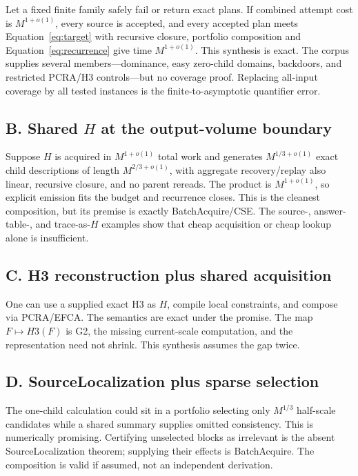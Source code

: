 \documentclass[11pt]{article}
\begin{document}
Let a fixed finite family safely fail or return exact plans.  If combined attempt cost is $M^{1+o(1)}$, every source is accepted, and every accepted plan meets Equation~\ref{eq:target} with recursive closure, portfolio composition and Equation~\ref{eq:recurrence} give time $M^{1+o(1)}$.  This synthesis is exact.  The corpus supplies several members---dominance, easy zero-child domains, backdoors, and restricted PCRA/H3 controls---but no coverage proof.  Replacing all-input coverage by all tested instances is the finite-to-asymptotic quantifier error.

\subsection{B. Shared $H$ at the output-volume boundary}

Suppose $H$ is acquired in $M^{1+o(1)}$ total work and generates $M^{1/3+o(1)}$ exact child descriptions of length $M^{2/3+o(1)}$, with aggregate recovery/replay also linear, recursive closure, and no parent rereads.  The product is $M^{1+o(1)}$, so explicit emission fits the budget and recurrence closes.  This is the cleanest composition, but its premise is exactly BatchAcquire/CSE.  The source-, answer-table-, and trace-as-$H$ examples show that cheap acquisition or cheap lookup alone is insufficient.

\subsection{C. H3 reconstruction plus shared acquisition}

One can use a supplied exact H3 as $H$, compile local constraints, and compose via PCRA/EFCA.  The semantics are exact under the promise.  The map $F\mapsto H3(F)$ is G2, the missing current-scale computation, and the representation need not shrink.  This synthesis assumes the gap twice.

\subsection{D. SourceLocalization plus sparse selection}

The one-child calculation could sit in a portfolio selecting only $M^{1/3}$ half-scale candidates while a shared summary supplies omitted consistency.  This is numerically promising.  Certifying unselected blocks as irrelevant is the absent SourceLocalization theorem; supplying their effects is BatchAcquire.  The composition is valid if assumed, not an independent derivation.
\end{document}
